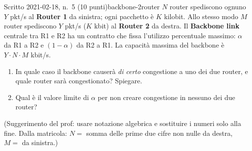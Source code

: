 \documentclass{report}
\begin{document}
\begin{Exercise}{Scritto 2021-02-18, n.\ 5 (10 punti)}{backbone-2router}
$N$ router spediscono ognuno $Y$ pkt/s al \textbf{Router 1} da sinistra; ogni
pacchetto è $K$ kilobit. Allo stesso modo $M$ router spediscono $Y$ pkt/s ($K$
kbit) al \textbf{Router 2} da destra. Il \textbf{Backbone link} centrale tra R1 e
R2 ha un contratto che fissa l'utilizzo percentuale massimo: $\alpha$ da R1 a R2 e
$(1-\alpha)$ da R2 a R1. La capacità massima del backbone è $Y\!\cdot\!N\!\cdot\!M$
kbit/s.
\begin{enumerate}
\item[a)] In quale caso il backbone causerà \emph{di certo} congestione a uno dei
due router, e quale router sarà congestionato? Spiegare.
\item[b)] Qual è il valore limite di $\alpha$ per non creare congestione in
nessuno dei due router?
\end{enumerate}
\footnotesize(Suggerimento del prof: usare notazione algebrica e sostituire i numeri
solo alla fine. Dalla matricola: $N=$ somma delle prime due cifre non nulle da
destra, $M=$ da sinistra.)
\end{Exercise}
\end{document}
